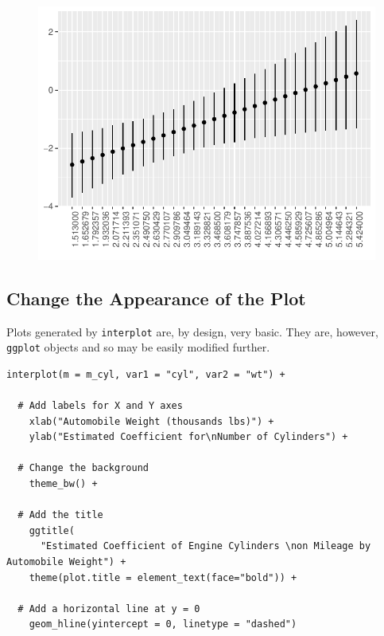 \documentclass[
  article]{jss}
\begin{document}
\begin{figure}[H]

{\centering \includegraphics{jss_manuscript_files/figure-pdf/unnamed-chunk-6-1.pdf}

}

\end{figure}

\hypertarget{sec-change-the-appearance-of-the-plot}{%
\subsection{Change the Appearance of the
Plot}\label{sec-change-the-appearance-of-the-plot}}

Plots generated by \texttt{interplot} are, by design, very basic. They
are, however, \texttt{ggplot} objects and so may be easily modified
further.

\begin{verbatim}
interplot(m = m_cyl, var1 = "cyl", var2 = "wt") + 

  # Add labels for X and Y axes
    xlab("Automobile Weight (thousands lbs)") +
    ylab("Estimated Coefficient for\nNumber of Cylinders") +
    
  # Change the background
    theme_bw() +
    
  # Add the title
    ggtitle(
      "Estimated Coefficient of Engine Cylinders \non Mileage by Automobile Weight") +
    theme(plot.title = element_text(face="bold")) +
    
  # Add a horizontal line at y = 0
    geom_hline(yintercept = 0, linetype = "dashed")
\end{verbatim}
\end{document}
